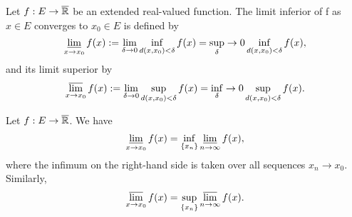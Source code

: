     \begin{definition}
        Let $f : E \to \overline{\mathbb{R}} $ be an extended real-valued function. The 
        limit
        inferior of f as $x \in E$ converges to $x_0 \in E$  is defined by 
        $$
            \varliminf_{x \to x_0} f(x) := \lim_{\delta \to 0} %
            \inf_{d(x, x_0) < \delta} f(x) = \sup_{\delta} \to 0 \inf_{d(x, 
            x_0) %
            < \delta} f(x),
        $$
        and its limit superior by 
        $$
            \varlimsup_{x \to x_0} f(x) := \lim_{\delta \to 0} %
            \sup_{d(x, x_0) < \delta} f(x) = \inf_{\delta} \to 0 \sup_{d(x, 
            x_0) %
            < \delta} f(x).
        $$
    \end{definition}
    \begin{lemma}\label{c1s5L1}
        Let $f : E \to \overline{\mathbb{R}} $. We have
        $$
            \varliminf_{x \to x_0} f(x) = \inf_{\{x_n\}}{\varliminf_{n \to 
            \infty}f(x)},
        $$
        where the infimum on the right-hand side is taken over all sequences 
        $x_n \to x_0$. Similarly, 
        $$
            \varlimsup_{x \to x_0} f(x) = \sup_{\{x_n\}}{\varlimsup_{n \to 
            \infty}f(x)}.
        $$
    \end{lemma}
